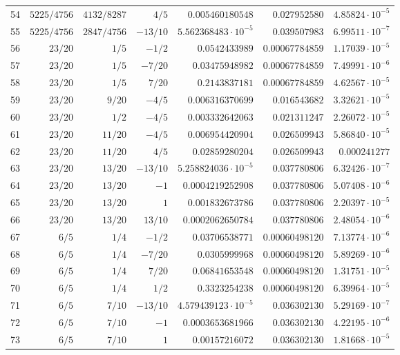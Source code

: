 \documentclass[11pt,reqno]{amsart}
\numberwithin{equation}{section}
\theoremstyle{definition}
\theoremstyle{remark}
\begin{document}
\begin{center}
\begin{longtable}{@{}rrrrrrr@{}}
54 & $5225/4756$ & $4132/8287$ & $4/5$ & $0.005460180548$ & $0.027952580$ & $4.85824\cdot10^{-5}$\\
55 & $5225/4756$ & $2847/4756$ & $-13/10$ & $5.562368483\cdot10^{-5}$ & $0.039507983$ & $6.99511\cdot10^{-7}$\\
56 & $23/20$ & $1/5$ & $-1/2$ & $0.0542433989$ & $0.00067784859$ & $1.17039\cdot10^{-5}$\\
57 & $23/20$ & $1/5$ & $-7/20$ & $0.03475948982$ & $0.00067784859$ & $7.49991\cdot10^{-6}$\\
58 & $23/20$ & $1/5$ & $7/20$ & $0.2143837181$ & $0.00067784859$ & $4.62567\cdot10^{-5}$\\
59 & $23/20$ & $9/20$ & $-4/5$ & $0.006316370699$ & $0.016543682$ & $3.32621\cdot10^{-5}$\\
60 & $23/20$ & $1/2$ & $-4/5$ & $0.003332642063$ & $0.021311247$ & $2.26072\cdot10^{-5}$\\
61 & $23/20$ & $11/20$ & $-4/5$ & $0.006954420904$ & $0.026509943$ & $5.86840\cdot10^{-5}$\\
62 & $23/20$ & $11/20$ & $4/5$ & $0.02859280204$ & $0.026509943$ & $0.000241277$\\
63 & $23/20$ & $13/20$ & $-13/10$ & $5.258824036\cdot10^{-5}$ & $0.037780806$ & $6.32426\cdot10^{-7}$\\
64 & $23/20$ & $13/20$ & $-1$ & $0.0004219252908$ & $0.037780806$ & $5.07408\cdot10^{-6}$\\
65 & $23/20$ & $13/20$ & $1$ & $0.001832673786$ & $0.037780806$ & $2.20397\cdot10^{-5}$\\
66 & $23/20$ & $13/20$ & $13/10$ & $0.0002062650784$ & $0.037780806$ & $2.48054\cdot10^{-6}$\\
67 & $6/5$ & $1/4$ & $-1/2$ & $0.03706538771$ & $0.00060498120$ & $7.13774\cdot10^{-6}$\\
68 & $6/5$ & $1/4$ & $-7/20$ & $0.0305999968$ & $0.00060498120$ & $5.89269\cdot10^{-6}$\\
69 & $6/5$ & $1/4$ & $7/20$ & $0.06841653548$ & $0.00060498120$ & $1.31751\cdot10^{-5}$\\
70 & $6/5$ & $1/4$ & $1/2$ & $0.3323254238$ & $0.00060498120$ & $6.39964\cdot10^{-5}$\\
71 & $6/5$ & $7/10$ & $-13/10$ & $4.579439123\cdot10^{-5}$ & $0.036302130$ & $5.29169\cdot10^{-7}$\\
72 & $6/5$ & $7/10$ & $-1$ & $0.0003653681966$ & $0.036302130$ & $4.22195\cdot10^{-6}$\\
73 & $6/5$ & $7/10$ & $1$ & $0.00157216072$ & $0.036302130$ & $1.81668\cdot10^{-5}$\\

\end{longtable}
\end{center}
\end{document}
